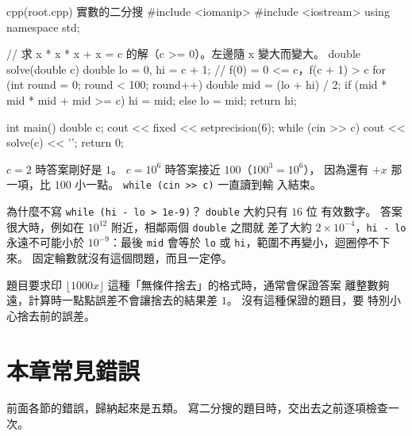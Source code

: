 \begin{example}[label=ex:root]{cpp}{(root.cpp) 實數的二分搜}
#include <iomanip>
#include <iostream>
using namespace std;

// 求 x * x * x + x = c 的解（c >= 0）。左邊隨 x 變大而變大。
double solve(double c) {
    double lo = 0, hi = c + 1;      // f(0) = 0 <= c，f(c + 1) > c
    for (int round = 0; round < 100; round++) {
        double mid = (lo + hi) / 2;
        if (mid * mid * mid + mid >= c) {
            hi = mid;
        } else {
            lo = mid;
        }
    }
    return hi;
}

int main() {
    double c;
    cout << fixed << setprecision(6);
    while (cin >> c) {
        cout << solve(c) << '\n';
    }
    return 0;
}
\end{example}


$c = 2$ 時答案剛好是 $1$。 $c = 10^6$ 時答案接近 $100$（$100^3 = 10^6$），
因為還有 $+x$ 那一項，比 $100$ 小一點。 \texttt{while (cin >> c)} 一直讀到輸
入結束。

為什麼不寫 \texttt{while (hi - lo > 1e-9)}？ \texttt{double} 大約只有 $16$ 位
有效數字。 答案很大時，例如在 $10^{12}$ 附近，相鄰兩個 \texttt{double} 之間就
差了大約 $2 \times 10^{-4}$，\texttt{hi - lo} 永遠不可能小於 $10^{-9}$：最後
\texttt{mid} 會等於 \texttt{lo} 或 \texttt{hi}，範圍不再變小，迴圈停不下來。
固定輪數就沒有這個問題，而且一定停。

題目要求印 $\lfloor 1000x \rfloor$ 這種「無條件捨去」的格式時，通常會保證答案
離整數夠遠，計算時一點點誤差不會讓捨去的結果差 $1$。 沒有這種保證的題目，要
特別小心捨去前的誤差。

\section{本章常見錯誤}
\label{sec:bs-pitfalls}

前面各節的錯誤，歸納起來是五類。 寫二分搜的題目時，交出去之前逐項檢查一次。

